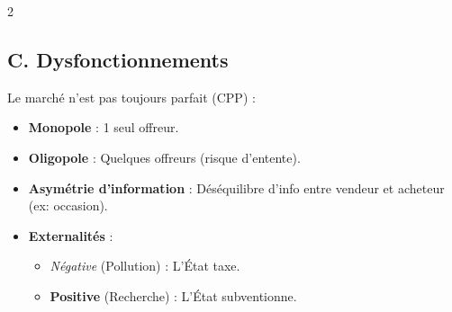 \documentclass[a4paper,10pt]{article}
\newcommand{\notion}[1]{\textbf{\textcolor{mainBlue}{#1}}}
\newcommand{\important}[1]{\textit{\textcolor{alertRed}{#1}}}
\newcommand{\definition}[1]{\textbf{\textcolor{softTeal}{#1}}}
\begin{document}
\begin{tcolorbox}[title=1. ÉCONOMIE : Agents et Marchés]
\begin{multicols}{2}
    \columnbreak

    \subsection*{C. Dysfonctionnements}
    Le marché n'est pas toujours parfait (CPP) :
    \begin{itemize}[leftmargin=*]
        \item \definition{Monopole} : 1 seul offreur.
        \item \definition{Oligopole} : Quelques offreurs (risque d'entente).
        \item \definition{Asymétrie d'information} : Déséquilibre d'info entre vendeur et acheteur (ex: occasion).
        \item \definition{Externalités} :
        \begin{itemize}
            \item \important{Négative} (Pollution) : L'État taxe.
            \item \notion{Positive} (Recherche) : L'État subventionne.
        \end{itemize}
    \end{itemize}

    \end{multicols}
\end{tcolorbox}
\end{document}
